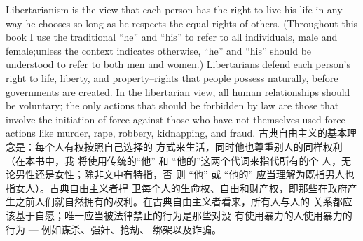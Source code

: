 \begin{paracol}{2}
\switchcolumn*
Libertarianism is the view that each person has the right to
live his life in any way he chooses so long as he respects the
equal rights of others. (Throughout this book I use the traditional ``he'' and ``his'' to refer to all individuals, male and female;unless the context indicates otherwise, ``he'' and ``his'' should be understood to refer to both men and women.) Libertarians defend each person's right to life, liberty, and property--rights that people possess naturally, before governments are created.
In the libertarian view, all human relationships should be voluntary; the only actions that should be forbidden by law are those that involve the initiation of force against those who have not themselves used force---actions like murder, rape, robbery, kidnapping, and fraud.
\switchcolumn
古典自由主义的基本理念是：每个人有权按照自己选择的
方式来生活，同时他也尊重别人的同样权利（在本书中，我
将使用传统的“他” 和 “他的”这两个代词来指代所有的个
人，无论男性还是女性；除非文中有特指，否 则 “他” 或
“他的” 应当理解为既指男人也指女人）。古典自由主义者捍
卫每个人的生命权、自由和财产权，即那些在政府产生之前人们就自然拥有的权利。在古典自由主义者看来，所有人与人的
关系都应该基于自愿；唯一应当被法律禁止的行为是那些对没
有使用暴力的人使用暴力的行为 --- 例如谋杀、强奸、抢劫、
绑架以及诈骗。


\end{paracol}
